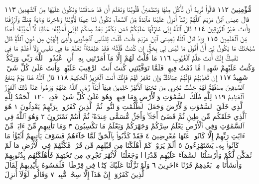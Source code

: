 مُّؤْمِنِينَ ١١٢ قَالُوا۟ نُرِيدُ أَن نَّأْكُلَ مِنْهَا وَتَطْمَئِنَّ قُلُوبُنَا
وَنَعْلَمَ أَن قَدْ صَدَقْتَنَا وَنَكُونَ عَلَيْهَا مِنَ ٱلشَّٰهِدِينَ ١١٣
قَالَ عِيسَى ٱبْنُ مَرْيَمَ ٱللَّهُمَّ رَبَّنَآ أَنزِلْ عَلَيْنَا مَآئِدَةࣰ مِّنَ ٱلسَّمَآءِ
تَكُونُ لَنَا عِيدࣰا لِّأَوَّلِنَا وَءَاخِرِنَا وَءَايَةࣰ مِّنكَۖ وَٱرْزُقْنَا وَأَنتَ
خَيْرُ ٱلرَّٰزِقِينَ ١١٤ قَالَ ٱللَّهُ إِنِّي مُنَزِّلُهَا عَلَيْكُمْۖ فَمَن يَكْفُرْ بَعْدُ
مِنكُمْ فَإِنِّيٓ أُعَذِّبُهُۥ عَذَابࣰا لَّآ أُعَذِّبُهُۥٓ أَحَدࣰا مِّنَ ٱلْعَٰلَمِينَ ١١٥
وَإِذْ قَالَ ٱللَّهُ يَٰعِيسَى ٱبْنَ مَرْيَمَ ءَأَنتَ قُلْتَ لِلنَّاسِ ٱتَّخِذُونِي
وَأُمِّيَ إِلَٰهَيْنِ مِن دُونِ ٱللَّهِۖ قَالَ سُبْحَٰنَكَ مَا يَكُونُ لِيٓ أَنْ أَقُولَ
مَا لَيْسَ لِي بِحَقٍّۚ إِن كُنتُ قُلْتُهُۥ فَقَدْ عَلِمْتَهُۥۚ تَعْلَمُ مَا فِي نَفْسِي
وَلَآ أَعْلَمُ مَا فِي نَفْسِكَۚ إِنَّكَ أَنتَ عَلَّٰمُ ٱلْغُيُوبِ ١١٦ مَا قُلْتُ لَهُمْ
إِلَّا مَآ أَمَرْتَنِي بِهِۦٓ أَنِ ٱعْبُدُوا۟ ٱللَّهَ رَبِّي وَرَبَّكُمْۚ وَكُنتُ عَلَيْهِمْ
شَهِيدࣰا مَّا دُمْتُ فِيهِمْۖ فَلَمَّا تَوَفَّيْتَنِي كُنتَ أَنتَ ٱلرَّقِيبَ عَلَيْهِمْۚ
وَأَنتَ عَلَىٰ كُلِّ شَيْءࣲ شَهِيدٌ ١١٧ إِن تُعَذِّبْهُمْ فَإِنَّهُمْ عِبَادُكَۖ وَإِن
تَغْفِرْ لَهُمْ فَإِنَّكَ أَنتَ ٱلْعَزِيزُ ٱلْحَكِيمُ ١١٨ قَالَ ٱللَّهُ هَٰذَا يَوْمُ يَنفَعُ
ٱلصَّٰدِقِينَ صِدْقُهُمْۚ لَهُمْ جَنَّٰتࣱ تَجْرِي مِن تَحْتِهَا ٱلْأَنْهَٰرُ خَٰلِدِينَ
فِيهَآ أَبَدࣰاۖ رَّضِيَ ٱللَّهُ عَنْهُمْ وَرَضُوا۟ عَنْهُۚ ذَٰلِكَ ٱلْفَوْزُ ٱلْعَظِيمُ ١١٩ لِلَّهِ
مُلْكُ ٱلسَّمَٰوَٰتِ وَٱلْأَرْضِ وَمَا فِيهِنَّۚ وَهُوَ عَلَىٰ كُلِّ شَيْءࣲ قَدِيرُۢ ١٢٠
ٱلْحَمْدُ لِلَّهِ ٱلَّذِي خَلَقَ ٱلسَّمَٰوَٰتِ وَٱلْأَرْضَ وَجَعَلَ ٱلظُّلُمَٰتِ
وَٱلنُّورَۖ ثُمَّ ٱلَّذِينَ كَفَرُوا۟ بِرَبِّهِمْ يَعْدِلُونَ ١ هُوَ ٱلَّذِي
خَلَقَكُم مِّن طِينࣲ ثُمَّ قَضَىٰٓ أَجَلࣰاۖ وَأَجَلࣱ مُّسَمًّى عِندَهُۥۖ ثُمَّ أَنتُمْ
تَمْتَرُونَ ٢ وَهُوَ ٱللَّهُ فِي ٱلسَّمَٰوَٰتِ وَفِي ٱلْأَرْضِ يَعْلَمُ سِرَّكُمْ
وَجَهْرَكُمْ وَيَعْلَمُ مَا تَكْسِبُونَ ٣ وَمَا تَأْتِيهِم مِّنْ ءَايَةࣲ مِّنْ
ءَايَٰتِ رَبِّهِمْ إِلَّا كَانُوا۟ عَنْهَا مُعْرِضِينَ ٤ فَقَدْ كَذَّبُوا۟ بِٱلْحَقِّ
لَمَّا جَآءَهُمْ فَسَوْفَ يَأْتِيهِمْ أَنۢبَٰٓؤُا۟ مَا كَانُوا۟ بِهِۦ يَسْتَهْزِءُونَ ٥
أَلَمْ يَرَوْا۟ كَمْ أَهْلَكْنَا مِن قَبْلِهِم مِّن قَرْنࣲ مَّكَّنَّٰهُمْ فِي ٱلْأَرْضِ
مَا لَمْ نُمَكِّن لَّكُمْ وَأَرْسَلْنَا ٱلسَّمَآءَ عَلَيْهِم مِّدْرَارࣰا وَجَعَلْنَا ٱلْأَنْهَٰرَ
تَجْرِي مِن تَحْتِهِمْ فَأَهْلَكْنَٰهُم بِذُنُوبِهِمْ وَأَنشَأْنَا مِنۢ بَعْدِهِمْ قَرْنًا
ءَاخَرِينَ ٦ وَلَوْ نَزَّلْنَا عَلَيْكَ كِتَٰبࣰا فِي قِرْطَاسࣲ فَلَمَسُوهُ بِأَيْدِيهِمْ
لَقَالَ ٱلَّذِينَ كَفَرُوٓا۟ إِنْ هَٰذَآ إِلَّا سِحْرࣱ مُّبِينࣱ ٧ وَقَالُوا۟ لَوْلَآ أُنزِلَ

